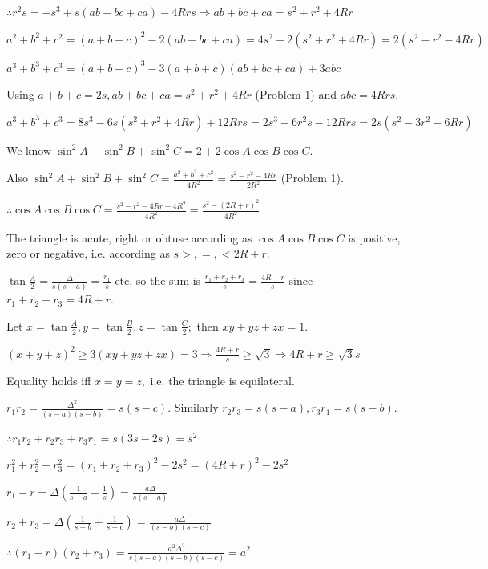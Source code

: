   $\therefore r^2s = -s^3 + s(ab + bc + ca) - 4Rrs \Rightarrow ab + bc + ca = s^2 + r^2 + 4Rr$

  $a^2 + b^2 + c^2 = (a + b + c)^2 - 2(ab + bc + ca) = 4s^2 - 2(s^2 + r^2 + 4Rr) = 2(s^2 - r^2 - 4Rr)$
\item $a^3 + b^3 + c^3 = (a + b + c)^3 - 3(a + b + c)(ab + bc + ca) + 3abc$

  Using $a + b + c = 2s, ab + bc + ca = s^2 + r^2 + 4Rr$ (Problem 1) and $abc = 4Rrs,$

  $a^3 + b^3 + c^3 = 8s^3 - 6s(s^2 + r^2 + 4Rr) + 12Rrs = 2s^3 - 6r^2s - 12Rrs = 2s(s^2 - 3r^2 - 6Rr)$
\item We know $\sin^2A + \sin^2B + \sin^2C = 2 + 2\cos A\cos B\cos C.$

  Also $\sin^2A + \sin^2B + \sin^2C = \frac{a^2 + b^2 + c^2}{4R^2} = \frac{s^2 - r^2 - 4Rr}{2R^2}$ (Problem 1).

  $\therefore \cos A\cos B\cos C = \frac{s^2 - r^2 - 4Rr - 4R^2}{4R^2} = \frac{s^2 - (2R + r)^2}{4R^2}$

  The triangle is acute, right or obtuse according as $\cos A\cos B\cos C$ is positive, zero or negative, i.e. according as
  $s >, =, < 2R + r.$
\item $\tan\frac{A}{2} = \frac{\Delta}{s(s - a)} = \frac{r_1}{s}$ etc. so the sum is $\frac{r_1 + r_2 + r_3}{s} = \frac{4R +
  r}{s}$ since $r_1 + r_2 + r_3 = 4R + r.$

  Let $x = \tan\frac{A}{2}, y = \tan\frac{B}{2}, z = \tan\frac{C}{2};$ then $xy + yz + zx = 1.$

  $(x + y + z)^2\geq 3(xy + yz + zx) = 3 \Rightarrow \frac{4R + r}{s}\geq \sqrt{3}\Rightarrow 4R + r\geq \sqrt{3}s$

  Equality holds iff $x = y = z,$ i.e. the triangle is equilateral.
\item $r_1r_2 = \frac{\Delta^2}{(s - a)(s - b)} = s(s - c).$ Similarly $r_2r_3 = s(s - a), r_3r_1 = s(s - b).$

  $\therefore r_1r_2 + r_2r_3 + r_3r_1 = s(3s - 2s) = s^2$

  $r_1^2 + r_2^2 + r_3^2 = (r_1 + r_2 + r_3)^2 - 2s^2 = (4R + r)^2 - 2s^2$
\item $r_1 - r = \Delta\left(\frac{1}{s - a} - \frac{1}{s}\right) = \frac{a\Delta}{s(s - a)}$

  $r_2 + r_3 = \Delta\left(\frac{1}{s - b} + \frac{1}{s - c}\right) = \frac{a\Delta}{(s - b)(s - c)}$

  $\therefore (r_1 - r)(r_2 + r_3) = \frac{a^2\Delta^2}{s(s - a)(s - b)(s - c)} = a^2$

